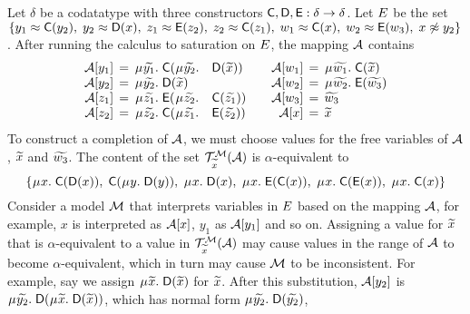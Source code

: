 \begin{examplex}
Let $\delta$ be a codatatype with three constructors $\textsf{C}, \textsf{D}, \textsf{E} :\delta \rightarrow \delta$.
Let $E$ be the set
$\{y_1 \approx \textsf{C}( y_2 ),\;
y_2 \approx \textsf{D}( x ),\;
z_1 \approx \textsf{E}( z_2 ),\;
z_2 \approx \textsf{C}( z_1 ),\;
w_1 \approx \textsf{C}( x ),\;
w_2 \approx \textsf{E}( w_3 ),\;
x \not\approx y_2\}$.
After running the calculus to saturation on $E$, the mapping $\mathcal{A}$ contains
\[\begin{array}{r@{}c@{}r@{\;}l@{}ll@{\qquad}r@{}c@{}l@{\;}l}
\Val \ec{y_1} & {}\,=\,{} & \MU {\Varec{y_1}}. & \const{C}( & \MU {\Varec{y_2}}. & \const{D}( {\Varec{x}} ) ) &
\Val \ec{w_1} & {}\,=\,{} & \MU {\Varec{w_1}}. & \const{C}( {\Varec{x}} )      \\
\Val \ec{y_2} & = & \MU {\Varec{y_2}}. & \multicolumn{2}{@{}l@{}}{\const{D}( {\Varec{x}} )}      & &
\Val \ec{w_2} & = & \MU {\Varec{w_2}}. & \const{E}( {\Varec{w_3}} ) \\
\Val \ec{z_1} & = & \MU {\Varec{z_1}}. & \const{E}( & \MU {\Varec{z_2}}. & \const{C}( {\Varec{z_1}} ) ) &
\Val \ec{w_3} & = & {\Varec{w_3}} \\
\Val \ec{z_2} & = & \MU {\Varec{z_2}}. & \const{C}( & \MU {\Varec{z_1}}. & \const{E}( {\Varec{z_2}} ) ) &
\Val \ec{x} & = & {\Varec{x}}
\end{array}\]
%
To construct a completion of $\mathcal{A}$, we must choose values for the free variables of $\mathcal{A}$, ${\widetilde{x}}$ and ${\widetilde{w_3}}$.
The content of the set $\mathcal{T}^{\mathcal{M}}_{{\widetilde{x}}}( \mathcal{A} )$ is $\alpha$-equivalent to
\[%
\{
\MU x.\; \const{C}( \const{D}( x )),\;
\const{C}( \MU y.\; \const{D}( y )),\;
\MU x.\; \const{D}( x ),\;
\MU x.\; \const{E}( \const{C}( x )),\;
\MU x.\; \const{C}( \const{E}( x )),\;
\MU x.\; \const{C}( x )
\}
\]
Consider a model $\mathcal{M}$ that interprets variables in $E$ based on the mapping $\mathcal{A}$,
for example, $x$ is interpreted as $\mathcal{A} [x]$, $y_1$ as $\mathcal{A} [y_1]$ and so on.
Assigning a value for ${\widetilde{x}}$ that is $\alpha$-equivalent to a value in $\mathcal{T}^{\mathcal{M}}_{{\widetilde{x}}}( \mathcal{A} )$
may cause values in the range of $\mathcal{A}$ to become $\alpha$-equivalent,
which in turn may cause $\mathcal{M}$ to be inconsistent.
For example, say we assign $\MU {\Varec{x}}.\; \const{D}( {\Varec{x}} )$ for ${\widetilde{x}}$.
After this substitution, $\mathcal{A} [y_2]$ is $\MU {\Varec{y_2}}.\; \const{D}( \MU {\Varec{x}}.\; \const{D}( {\Varec{x}} ) )$,
which has normal form $\MU {\Varec{y_2}}.\; \const{D}( {\Varec{y_2}} )$,

\end{examplex}
